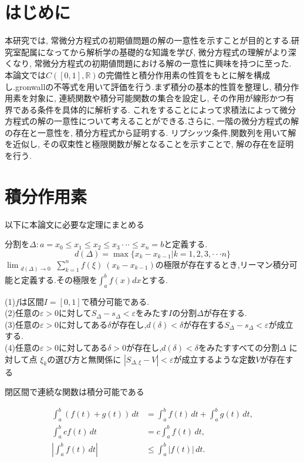 \documentclass[12pt]{bxjsarticle}
\begin{document}
\section{はじめに}
本研究では, 常微分方程式の初期値問題の解の一意性を示すことが目的とする.研究室配属になってから解析学の基礎的な知識を学び, 微分方程式の理解がより深くなり, 常微分方程式の初期値問題における解の一意性に興味を持つに至った. 本論文では$C([0,1],\mathbb{R})$の完備性と積分作用素の性質をもとに解を構成し.gronwallの不等式を用いて評価を行う.まず積分の基本的性質を整理し, 積分作用素を対象に, 連続関数や積分可能関数の集合を設定し, その作用が線形かつ有界である条件を具体的に解析する.
これをすることによって求積法によって微分方程式の解の一意性について考えることができる.さらに, 一階の微分方程式の解の存在と一意性を, 積分方程式から証明する.
リプシッツ条件,関数列を用いて解を近似し, その収束性と極限関数が解となることを示すことで, 解の存在を証明を行う.



\section{積分作用素}
\label{sec:積分作用素}
以下に本論文に必要な定理にまとめる
\begin{Lemma}[リーマン積分]
分割を$\Delta:a=x_{0}\leq x_{1} \leq x_{2} \leq x_{3} \cdot \cdot \cdot  \leq x_{n}=b$と定義する.
\[d(\Delta)=\max\{x_{k}-x_{k-1}|k=1,2,3,\cdot \cdot\cdot n \}\]
    $\displaystyle \lim_{\substack{d(\Delta) \to 0}} \sum_{k=1}^{n} f(\xi) \ (x_k - x_{k-1})$の極限が存在するとき,リーマン積分可能と定義する.その極限を$\displaystyle \int_{a}^{b} f(x) dx$とする.
\end{Lemma}
\begin{Lemma}
(1)$f$は区間$I=[0,1]$で積分可能である.\\
(2)任意の$\varepsilon>0$に対して$S_{\Delta}-s_{\Delta}<\varepsilon$をみたす$I$の分割$\Delta $が存在する.\\
(3)任意の$\varepsilon>0$に対してある$\delta$が存在し,$d(\delta)<\delta$が存在する$ S_{\Delta}-s_{\Delta}<\varepsilon$が成立する.\\
(4)任意の$\varepsilon>0$に対してある$\delta>0$が存在し,$d(\delta)<\delta$をみたすすべての分割$\Delta$ に対して点 $\xi_{k}$の選び方と無関係に
$|S_{\Delta,\xi}-V|<\varepsilon$が成立するような定数$V$が存在する
\end{Lemma}
\begin{Lemma}
閉区間で連続な関数は積分可能である
\end{Lemma}
\begin{Lemma}[定積分の基本的性質]
\begin{align}
\displaystyle \int_{a}^{b} (f(t) + g(t)) \, dt &= \displaystyle \int_{a}^{b} f(t) \, dt + \displaystyle \int_{a}^{b} g(t) \, dt, \\
\displaystyle \int_{a}^{b} c f(t) \, dt &= c \displaystyle \int_{a}^{b} f(t) \, dt, \\
\displaystyle \left| \int_{a}^{b} f(t) \, dt \right| &\leq \displaystyle \int_{a}^{b} |f(t)| \, dt.
\end{align}

\end{Lemma}
\end{document}
